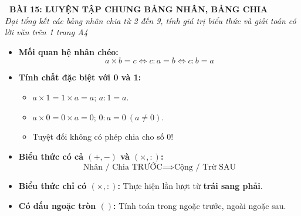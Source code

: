 \documentclass[12pt,a4paper]{article}
\begin{document}
\begin{tcolorbox}[
  enhanced,
  colback=teal!8!white,
  colframe=teal!70!black,
  arc=3mm, boxrule=1.2pt,
  left=3mm, right=3mm, top=2mm, bottom=2mm,
  halign=center
]
  {\LARGE\bfseries\color{teal!90!black}\faBookmark\ BÀI 15: LUYỆN TẬP CHUNG BẢNG NHÂN, BẢNG CHIA}\\[1mm]
  {\itshape\footnotesize\color{black!75} Đại tổng kết các bảng nhân chia từ 2 đến 9, tính giá trị biểu thức và giải toán có lời văn trên 1 trang A4}
\end{tcolorbox}

\vspace{-2mm}

\noindent
\begin{minipage}[t]{0.49\textwidth}\vspace{0pt}
\begin{tcolorbox}[
  enhanced,
  colback=blue!4!white,
  colframe=blue!75!black,
  arc=2mm, boxrule=0.8pt,
  left=2mm, right=2mm, top=1.8mm, bottom=1.8mm,
  title={\footnotesize\bfseries\color{white}\faKey\ 1. Ma trận Bảng nhân chia 2 - 9}
]
{\footnotesize
\begin{itemize}\setlength{\itemsep}{1pt}\setlength{\leftskip}{-2.5mm}
  \item \textbf{Mối quan hệ nhân chéo:}
  $$a \times b = c \iff c : a = b \iff c : b = a$$
  \item \textbf{Tính chất đặc biệt với 0 và 1:}
  \begin{itemize}\setlength{\itemsep}{0.5pt}\setlength{\leftskip}{-2.5mm}
    \item $a \times 1 = 1 \times a = a$; $a : 1 = a$.
    \item $a \times 0 = 0 \times a = 0$; $0 : a = 0\ (a \ne 0)$.
    \item Tuyệt đối không có phép chia cho số $0$!
  \end{itemize}
\end{itemize}
}
\end{tcolorbox}
\end{minipage}
\hfill
\begin{minipage}[t]{0.49\textwidth}\vspace{0pt}
\begin{tcolorbox}[
  enhanced,
  colback=teal!4!white,
  colframe=teal!75!black,
  arc=2mm, boxrule=0.8pt,
  left=2mm, right=2mm, top=1.8mm, bottom=1.8mm,
  title={\footnotesize\bfseries\color{white}\faCalculator\ 2. Thứ tự thực hiện phép tính}
]
{\footnotesize
\begin{itemize}\setlength{\itemsep}{1pt}\setlength{\leftskip}{-2.5mm}
  \item \textbf{Biểu thức có cả $(+, -)$ và $(\times, :)$:}
  $$\text{Nhân / Chia TRƯỚC} \implies \text{Cộng / Trừ SAU}$$
  \item \textbf{Biểu thức chỉ có $(\times, :)$:} Thực hiện lần lượt từ \textbf{trái sang phải}.
  \item \textbf{Có dấu ngoặc tròn $( )$:} Tính toán trong ngoặc trước, ngoài ngoặc sau.
\end{itemize}
}
\end{tcolorbox}
\end{minipage}
\end{document}
